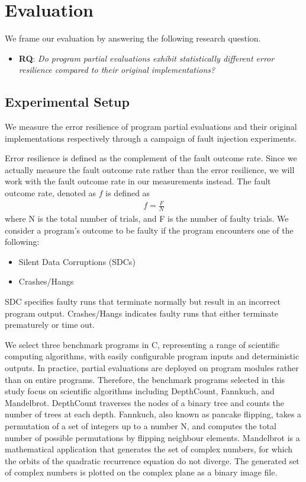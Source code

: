 \section{Evaluation}
\label{sec:evaluation}

We frame our evaluation by answering the following research question. 

\begin{itemize}
\item {\bf RQ}: \textit{Do program partial evaluations exhibit statistically different error resilience compared to their original implementations?}
\end{itemize}

\subsection{Experimental Setup}
\label{sec:exp.setup}

We measure the error resilience of program partial evaluations and their original implementations respectively through a campaign of fault injection experiments. 

Error resilience is defined as the complement of the fault outcome rate.
Since we actually measure the fault outcome rate rather than the error resilience, we will work with the fault outcome rate in our measurements instead.
The fault outcome rate, denoted as $f$ is defined as 
\begin{align*}
f = \frac{F}{N}
\end{align*}
where N is the total number of trials, and F is the number of faulty trials.
We consider a program's outcome to be faulty if the program encounters one of the following:
\begin{itemize}
\item Silent Data Corruptions (SDCs) 
\item Crashes/Hangs
\end{itemize}

SDC specifies faulty runs that terminate normally but result in an incorrect program output. 
Crashes/Hangs indicates faulty runs that either terminate prematurely or time out.

\bigbreak

We select three benchmark programs in C, representing a range of scientific computing algorithms, with easily configurable program inputs and deterministic outputs.
In practice, partial evaluations are deployed on program modules rather than on entire programs. 
Therefore, the benchmark programs selected in this study focus on scientific algorithms including DepthCount, Fannkuch, and Mandelbrot.
DepthCount traverses the nodes of a binary tree and counts the number of trees at each depth.
Fannkuch, also known as pancake flipping, takes a permutation of a set of integers up to a number N, and computes the total number of possible permutations by flipping neighbour elements.
Mandelbrot is a mathematical application that generates the set of complex numbers, for which the orbits of the quadratic recurrence equation do not diverge.
The generated set of complex numbers is plotted on the complex plane as a binary image file.

